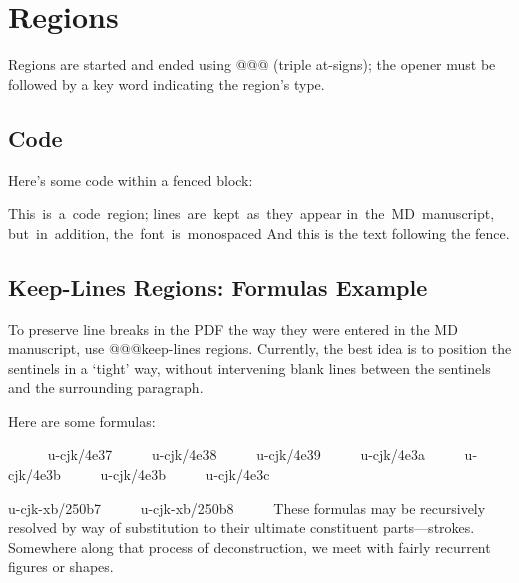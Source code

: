 \chapter{Regions
}
\begin{multicols}{2}Regions are started and ended using {\mktsStyleCode{}@@@} (triple at-signs); the opener
must be followed by a key word indicating the region’s type.\mktsShowpar\par
\end{multicols}
\section{Code
}
\begin{multicols}{2}Here’s {\mktsStyleCode{}some code} within a fenced block:\mktsShowpar\par
\begingroup\obeyalllines\mktsStyleCode{}This is a code region;
lines are kept as they appear
in the MD manuscript,
but in addition,
the font is monospaced
\endgroup{}And this is the text following the fence.\mktsShowpar\par
\end{multicols}
\section{Keep-Lines Regions: Formulas Example
}
\begin{multicols}{2}To preserve line breaks in the PDF the way they were entered in
the MD manuscript, use {\mktsStyleCode{}@@@keep-lines} regions. Currently, the
best idea is to position the sentinels in a ‘tight’ way, without
intervening blank lines between the sentinels and the surrounding
paragraph.\mktsShowpar\par
Here are some formulas:
\mktsShowpar\par
\begingroup{}     
{\mktsStyleCode{}u-cjk/4e37}     
{\mktsStyleCode{}u-cjk/4e38}     
{\mktsStyleCode{}u-cjk/4e39}     
{\mktsStyleCode{}u-cjk/4e3a}     
{\mktsStyleCode{}u-cjk/4e3b}     
{\mktsStyleCode{}u-cjk/4e3b}     
{\mktsStyleCode{}u-cjk/4e3c}     

{\mktsStyleCode{}u-cjk-xb/250b7}     
{\mktsStyleCode{}u-cjk-xb/250b8}     
\endgroup{}These formulas may be recursively resolved by way of substitution to their
ultimate constituent parts—strokes. Somewhere along that process of
deconstruction, we meet with fairly recurrent figures or shapes.\mktsShowpar\par
\end{multicols}
